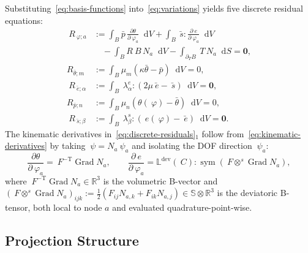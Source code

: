 \documentclass[12pt]{article}
\newcommand{\F}{~F}
\newcommand{\C}{~C}
\newcommand{\edev}{~e}
\newcommand{\ebar}{\bar{~e}}
\newcommand{\sbar}{\bar{~s}}
\newcommand{\thbar}{\bar{\theta}}
\newcommand{\pbar}{\bar{p}}
\newcommand{\Syms}{\mathbb{S}}
\newcommand{\supdev}{^{\mathrm{dev}}}
\DeclareMathOperator{\Grad}{Grad}
\DeclareMathOperator{\sym}{sym}
\newcommand*\diff{\mathop{}\!\mathrm{d}}
\begin{document}
Substituting~\eqref{eq:basis-functions} into~\eqref{eq:variations}
yields five discrete residual equations:
\begin{equation}
  \label{eq:discrete-residuals}
  \begin{split}
    ~R_{~\varphi;a} & :=
    \int_B \pbar \, \frac{\partial \theta}{\partial ~\varphi_a} \diff V
    +
    \int_B \sbar : \frac{\partial \edev}{\partial ~\varphi_a} \diff V
    \\
    & \quad
    -
    \int_B R ~B \, N_a \diff V
    -
    \int_{\partial_T B} ~T \, N_a \diff S
    = \mathbf{0},
    \\
    R_{\thbar;m} & :=
    \int_B \mu_m \left( \kappa \thbar - \pbar \right) \diff V
    = 0,
    \\
    ~R_{\ebar;\alpha} & :=
    \int_B ~\lambda^e_\alpha : \left( 2\mu \ebar - \sbar \right) \diff V
    = \mathbf{0},
    \\
    R_{\pbar;n} & :=
    \int_B \mu_n \left( \theta(~\varphi) - \thbar \right) \diff V
    = 0,
    \\
    ~R_{\sbar;\beta} & :=
    \int_B ~\lambda^s_\beta : \left( \edev(~\varphi) - \ebar \right) \diff V
    = \mathbf{0}.
  \end{split}
\end{equation}
The kinematic derivatives in~\eqref{eq:discrete-residuals}$_1$
follow from~\eqref{eq:kinematic-derivatives} by taking
$~\psi = N_a ~\psi_a$ and isolating the DOF direction
$~\psi_a$:
\begin{equation}
  \label{eq:kinematic-derivatives-discrete}
  \frac{\partial \theta}{\partial ~\varphi_a}
  =
  \F^{-\mathrm{T}} \Grad N_a,
  \qquad
  \frac{\partial \edev}{\partial ~\varphi_a}
  =
  \mathbb{L}\supdev(\C) : \sym\!\left(\F \otimes^s \Grad N_a\right),
\end{equation}
where $\F^{-\mathrm{T}} \Grad N_a \in \mathbb{R}^3$ is the
volumetric B-vector and
$(\F \otimes^s \Grad N_a)_{ijk} :=
\tfrac{1}{2}\left(F_{ij} N_{a,k} + F_{ik} N_{a,j}\right) \in \Syms \otimes
\mathbb{R}^3$ is the deviatoric B-tensor, both local to node $a$
and evaluated quadrature-point-wise.

\subsection{Projection Structure}
\label{sec:projection}
\end{document}
